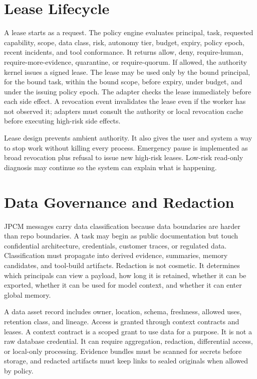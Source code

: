 \documentclass[journal,onecolumn]{IEEEtran}
\begin{document}
\section{Lease Lifecycle}
A lease starts as a request. The policy engine evaluates principal, task, requested capability, scope, data class, risk, autonomy tier, budget, expiry, policy epoch, recent incidents, and tool conformance. It returns allow, deny, require-human, require-more-evidence, quarantine, or require-quorum. If allowed, the authority kernel issues a signed lease. The lease may be used only by the bound principal, for the bound task, within the bound scope, before expiry, under budget, and under the issuing policy epoch. The adapter checks the lease immediately before each side effect. A revocation event invalidates the lease even if the worker has not observed it; adapters must consult the authority or local revocation cache before executing high-risk side effects.

Lease design prevents ambient authority. It also gives the user and system a way to stop work without killing every process. Emergency pause is implemented as broad revocation plus refusal to issue new high-risk leases. Low-risk read-only diagnosis may continue so the system can explain what is happening.

\section{Data Governance and Redaction}
JPCM messages carry data classification because data boundaries are harder than repo boundaries. A task may begin as public documentation but touch confidential architecture, credentials, customer traces, or regulated data. Classification must propagate into derived evidence, summaries, memory candidates, and tool-build artifacts. Redaction is not cosmetic. It determines which principals can view a payload, how long it is retained, whether it can be exported, whether it can be used for model context, and whether it can enter global memory.

A data asset record includes owner, location, schema, freshness, allowed uses, retention class, and lineage. Access is granted through context contracts and leases. A context contract is a scoped grant to use data for a purpose. It is not a raw database credential. It can require aggregation, redaction, differential access, or local-only processing. Evidence bundles must be scanned for secrets before storage, and redacted artifacts must keep links to sealed originals when allowed by policy.
\end{document}
